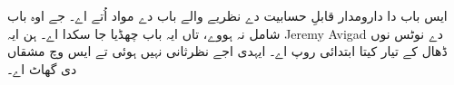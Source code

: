 \documentclass[../../../include/open-logic-chapter]{subfiles}
\begin{document}
\begin{editorial}
  ایس باب دا دارومدار قابلِ حسابیت دے نظریے والے باب دے مواد اُتے اے۔
  جے اوہ باب شامل نہ ہووے، تاں ایہ باب چھڈیا جا سکدا اے۔ ہن ایہ
  Jeremy Avigad دے نوٹس نوں ڈھال کے تیار کیتا ابتدائی روپ اے۔
  ایہدی اجے نظرثانی نہیں ہوئی تے ایس وچ مشقاں دی گھاٹ اے۔
\end{editorial}












\OLEndChapterHook
\end{document}
